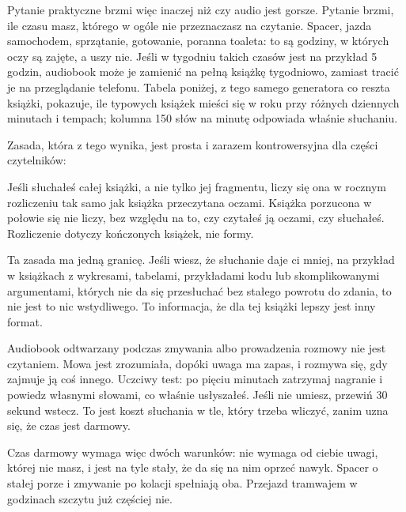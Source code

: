 Pytanie praktyczne brzmi więc inaczej niż \glqq czy audio jest gorsze\grqq{}. Pytanie brzmi, ile czasu masz, którego w ogóle nie przeznaczasz na czytanie. Spacer, jazda samochodem, sprzątanie, gotowanie, poranna toaleta: to są godziny, w których oczy są zajęte, a uszy nie. Jeśli w tygodniu takich czasów jest na przykład 5 godzin, audiobook może je zamienić na pełną książkę tygodniowo, zamiast tracić je na przeglądanie telefonu. Tabela poniżej, z tego samego generatora co reszta książki, pokazuje, ile typowych książek mieści się w roku przy różnych dziennych minutach i tempach; kolumna 150 słów na minutę odpowiada właśnie słuchaniu.


Zasada, która z tego wynika, jest prosta i zarazem kontrowersyjna dla części czytelników:

\begin{zasada}
  Jeśli słuchałeś całej książki, a nie tylko jej fragmentu, liczy się ona w rocznym rozliczeniu tak samo jak książka przeczytana oczami. Książka porzucona w połowie się nie liczy, bez względu na to, czy czytałeś ją oczami, czy słuchałeś. Rozliczenie dotyczy kończonych książek, nie formy.
\end{zasada}

Ta zasada ma jedną granicę. Jeśli wiesz, że słuchanie daje ci mniej, na przykład w książkach z wykresami, tabelami, przykładami kodu lub skomplikowanymi argumentami, których nie da się przesłuchać bez stałego powrotu do zdania, to nie jest to nic wstydliwego. To informacja, że dla tej książki lepszy jest inny format.

\begin{falle}
  Audiobook odtwarzany podczas zmywania albo prowadzenia rozmowy nie jest czytaniem. Mowa jest zrozumiała, dopóki uwaga ma zapas, i rozmywa się, gdy zajmuje ją coś innego. Uczciwy test: po pięciu minutach zatrzymaj nagranie i powiedz własnymi słowami, co właśnie usłyszałeś. Jeśli nie umiesz, przewiń 30 sekund wstecz. To jest koszt słuchania w tle, który trzeba wliczyć, zanim uzna się, że czas jest \glqq darmowy\grqq{}.
\end{falle}

Czas \glqq darmowy\grqq{} wymaga więc dwóch warunków: nie wymaga od ciebie uwagi, której nie masz, i jest na tyle stały, że da się na nim oprzeć nawyk. Spacer o stałej porze i zmywanie po kolacji spełniają oba. Przejazd tramwajem w godzinach szczytu już częściej nie.

